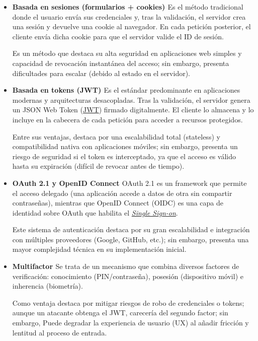 \begin{itemize}
    \item \textbf{Basada en sesiones (formularios + cookies) \cite{authCookies}}
    \newline
    Es el método tradicional donde el usuario envía sus credenciales y, tras la validación, el servidor crea una sesión 
    y devuelve una cookie al navegador. En cada petición posterior, el cliente envía dicha cookie para que el servidor 
    valide el ID de sesión.

    Es un método que destaca su alta seguridad en aplicaciones web simples y capacidad de revocación instantánea del 
    acceso; sin embargo, presenta dificultades para escalar (debido al estado en el servidor).

    \item \textbf{Basada en tokens (JWT) \cite{authJWT}}
    \newline
    Es el estándar predominante en aplicaciones modernas y arquitecturas desacopladas. Tras la validación, el servidor 
    genera un JSON Web Token (\hyperlink{jwt}{JWT}) firmado digitalmente. El cliente lo almacena y lo incluye en la cabecera de cada 
    petición para acceder a recursos protegidos.

    Entre sus ventajas, destaca por una escalabilidad total (stateless) y compatibilidad nativa con aplicaciones móviles;
    sin embargo, presenta un riesgo de seguridad si el token es interceptado, ya que el acceso es válido hasta su 
    expiración (difícil de revocar antes de tiempo).

    \item \textbf{OAuth 2.1 y OpenID Connect \cite{oauth}}
    \newline
    OAuth 2.1 es un framework que permite el acceso delegado (una aplicación accede a datos de otra sin compartir contraseñas), 
    mientras que OpenID Connect (OIDC) es una capa de identidad sobre OAuth que habilita el \hyperlink{singleSignOn}{\textit{Single Sign-on}}.

    Este sistema de autenticación destaca por su gran escalabilidad e integración con múltiples proveedores (Google, GitHub, etc.);
    sin embargo, presenta una mayor complejidad técnica en su implementación inicial.

    \item \textbf{Multifactor \cite{multifactor}}
    \newline
    Se trata de un mecanismo que combina diversos factores de verificación: conocimiento (PIN/contraseña), posesión (dispositivo 
    móvil) e inherencia (biometría).

    Como ventaja destaca por mitigar riesgos de robo de credenciales o tokens; aunque un atacante obtenga el JWT, carecería del 
    segundo factor; sin embargo, Puede degradar la experiencia de usuario (UX) al añadir fricción y lentitud al proceso de entrada.
\end{itemize}

